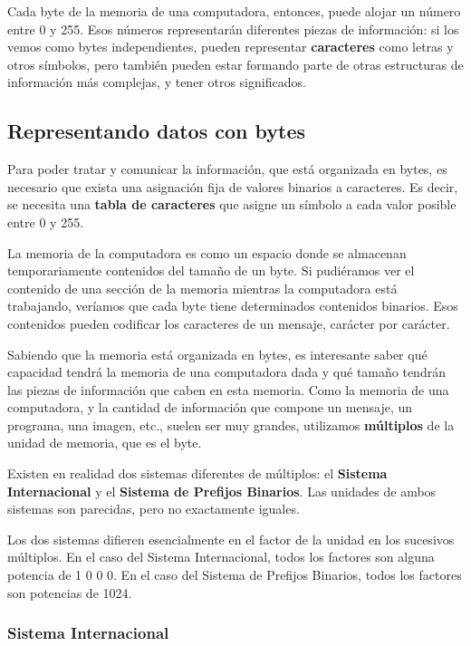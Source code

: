 \documentclass[spanish,A4,]{article}
\begin{document}
Cada byte de la memoria de una computadora, entonces, puede alojar un
número entre 0 y 255. Esos números representarán diferentes piezas de
información: si los vemos como bytes independientes, pueden representar
\textbf{caracteres} como letras y otros símbolos, pero también pueden
estar formando parte de otras estructuras de información más complejas,
y tener otros significados.

\subsection{Representando datos con
bytes}\label{representando-datos-con-bytes}

Para poder tratar y comunicar la información, que está organizada en
bytes, es necesario que exista una asignación fija de valores binarios a
caracteres. Es decir, se necesita una \textbf{tabla de caracteres} que
asigne un símbolo a cada valor posible entre 0 y 255.

La memoria de la computadora es como un espacio donde se almacenan
temporariamente contenidos del tamaño de un byte. Si pudiéramos ver el
contenido de una sección de la memoria mientras la computadora está
trabajando, veríamos que cada byte tiene determinados contenidos
binarios. Esos contenidos pueden codificar los caracteres de un mensaje,
carácter por carácter.

Sabiendo que la memoria está organizada en bytes, es interesante saber
qué capacidad tendrá la memoria de una computadora dada y qué tamaño
tendrán las piezas de información que caben en esta memoria. Como la
memoria de una computadora, y la cantidad de información que compone un
mensaje, un programa, una imagen, etc., suelen ser muy grandes,
utilizamos \textbf{múltiplos} de la unidad de memoria, que es el byte.

Existen en realidad dos sistemas diferentes de múltiplos: el
\textbf{Sistema Internacional} y el \textbf{Sistema de Prefijos
Binarios}. Las unidades de ambos sistemas son parecidas, pero no
exactamente iguales.

Los dos sistemas difieren esencialmente en el factor de la unidad en los
sucesivos múltiplos. En el caso del Sistema Internacional, todos los
factores son alguna potencia de 1 0 0 0. En el caso del Sistema de Prefijos
Binarios, todos los factores son potencias de 1024.

\subsubsection{Sistema Internacional}\label{sistema-internacional}
\end{document}
